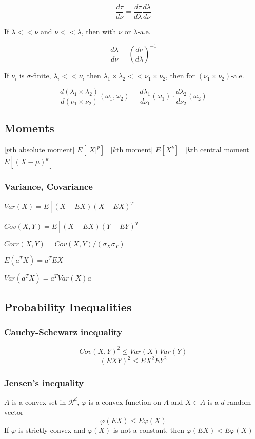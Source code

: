 $$
\frac{d\tau}{d\nu} = \frac{d\tau}{d\lambda}\frac{d\lambda}{d\nu}
$$

If $\lambda << \nu$ and $\nu << \lambda$, then with $\nu$ or $\lambda$-a.e.

$$
\frac{d\lambda}{d\nu} = \left(\frac{d\nu}{d\lambda}\right)^{-1}
$$

If $\nu_i$ is $\sigma$-finite, $\lambda_i << \nu_i$ then $\lambda_1 \times \lambda_2 << \nu_1 \times \nu_2$, then for $(\nu_1\times \nu_2)$-a.e.

$$
\frac{d(\lambda_1 \times \lambda_2)}{d(\nu_1\times \nu_2)} (\omega_1, \omega_2) = \frac{d\lambda_1}{d\nu_1}(\omega_1)\cdot \frac{d\lambda_2}{d\nu_2} (\omega_2)
$$

\subsection{Moments}
[$p$th absolute moment]
$E[|X|^p]$
\
[$k$th moment]
$E[X^k]$
\
[$k$th central moment]
$E[(X-\mu)^k]$

\subsubsection{Variance, Covariance}

$Var(X) = E[(X-EX)(X-EX)^T]$

$Cov(X, Y) = E[(X-EX)(Y-EY)^T]$

$Corr(X, Y) = Cov(X, Y)/(\sigma_X\sigma_Y)$

$E(a^TX)=a^TEX$

$Var(a^TX)=a^TVar(X)a$

\subsection{Probability Inequalities}

\subsubsection{Cauchy-Schewarz inequality}
$$
Cov(X, Y)^2 \leq Var(X)Var(Y)
$$
$$
(EXY)^2 \leq EX^2 EY^2
$$

\subsubsection{Jensen's inequality}

$A$ is a convex set in $\mathcal{R}^d$, $\varphi$ is a convex function on $A$ and $X\in A$ is a $d$-random vector
$$
\varphi(EX) \leq E\varphi(X)
$$
If $\varphi$ is strictly convex and $\varphi(X)$ is not a constant, then $\varphi(EX) < E\varphi(X)$

